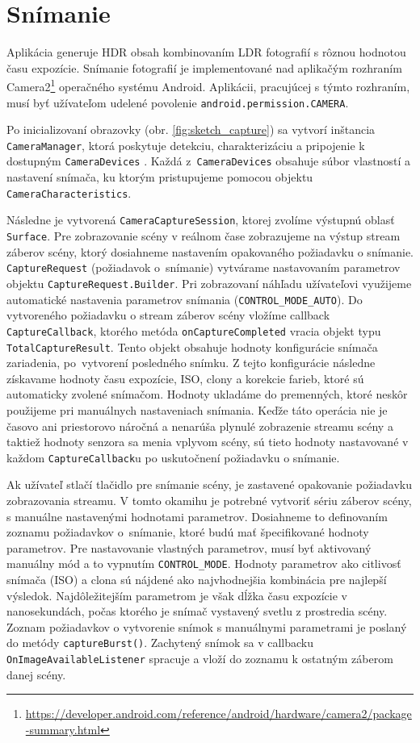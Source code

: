 \section{Snímanie}
\label{sec:Practice-Capturing}

Aplikácia generuje HDR obsah kombinovaním LDR fotografií s rôznou hodnotou času expozície.
Snímanie fotografií je implementované nad aplikačým rozhraním
Camera2\footnote{\url{https://developer.android.com/reference/android/hardware/camera2/package-summary.html}}
operačného systému Android. Aplikácii, pracujúcej s týmto rozhraním, musí byť užívateľom udelené povolenie 
\texttt{android.permission.CAMERA}.

Po inicializovaní obrazovky (obr. \ref{fig:sketch_capture}) sa vytvorí inštancia \texttt{CameraManager}, ktorá poskytuje
detekciu, charakterizáciu a pripojenie k dostupným \texttt{CameraDevices} \cite{Android}.
Každá z~\texttt{CameraDevices} obsahuje súbor vlastností a nastavení snímača, ku ktorým pristupujeme pomocou
objektu \texttt{CameraCharacteristics}.

Následne je vytvorená \texttt{CameraCaptureSession}, ktorej zvolíme výstupnú oblasť \texttt{Surface}. 
Pre zobrazovanie scény v reálnom čase zobrazujeme na výstup stream záberov scény, ktorý dosiahneme nastavením
opakovaného požiadavku o snímanie. \texttt{CaptureRequest} (požiadavok o~snímanie) vytvárame nastavovaním parametrov
objektu \texttt{CaptureRequest.Builder}. Pri zobrazovaní náhľadu užívateľovi využijeme automatické nastavenia
parametrov snímania (\texttt{CONTROL\_MODE\_AUTO}). Do vytvoreného požiadavku o stream záberov scény vložíme callback
\texttt{CaptureCallback}, ktorého metóda \texttt{onCaptureCompleted} vracia objekt typu \texttt{TotalCaptureResult}.
Tento objekt obsahuje hodnoty konfigurácie snímača zariadenia, po~vytvorení posledného snímku. Z tejto
konfigurácie následne získavame hodnoty času expozície, ISO, clony a korekcie farieb, ktoré sú automaticky zvolené
snímačom. Hodnoty ukladáme do premenných, ktoré neskôr použijeme pri manuálnych nastaveniach snímania. Keďže táto
operácia nie je časovo ani priestorovo náročná a nenarúša plynulé zobrazenie streamu scény a taktiež hodnoty
senzora sa menia vplyvom scény, sú tieto hodnoty nastavované v každom \texttt{CaptureCallback}u po uskutočnení
požiadavku o snímanie.

Ak užívateľ stlačí tlačidlo pre snímanie scény, je zastavené opakovanie požiadavku zobrazovania streamu.
V tomto okamihu je potrebné vytvoriť sériu záberov scény, s manuálne nastavenými hodnotami parametrov.
Dosiahneme to definovaním zoznamu požiadavkov o~snímanie, ktoré budú mať špecifikované hodnoty parametrov.
Pre nastavovanie vlastných parametrov, musí byť aktivovaný manuálny mód a to vypnutím \texttt{CONTROL\_MODE}.
Hodnoty parametrov ako citlivosť snímača (ISO) a clona sú nájdené ako najvhodnejšia kombinácia 
pre najlepší výsledok. Najdôležitejším parametrom je však dĺžka času expozície v nanosekundách,
počas ktorého je snímač vystavený svetlu z prostredia scény.
Zoznam požiadavkov o vytvorenie snímok s manuálnymi parametrami je poslaný do metódy \texttt{captureBurst()}.
Zachytený snímok sa v callbacku \texttt{OnImageAvailableListener} spracuje a vloží do zoznamu k ostatným záberom 
danej scény.

